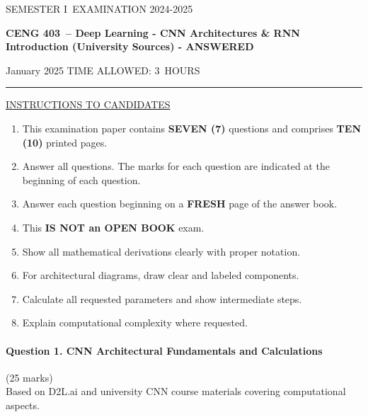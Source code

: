 \documentclass[12pt]{article}
\newcommand{\masunitnumber}{CENG 403}
\newcommand{\examdate}{January 2025}
\newcommand{\academicyear}{2024-2025}
\newcommand{\semester}{I}
\newcommand{\coursename}{Deep Learning - CNN Architectures \& RNN Introduction (University Sources) - ANSWERED}
\newcommand{\numberofhours}{3}
\begin{document}
\setlength{\headsep}{5truemm}
\setlength{\headheight}{14.5truemm}
\setlength{\voffset}{-0.45truein}
\renewcommand{\headrulewidth}{0.0pt}
\begin{center}
SEMESTER \semester\ EXAMINATION \academicyear
\end{center}
\begin{center}
{\bf \masunitnumber\ -- \coursename}
\end{center}
\vspace{20truemm}
\noindent \examdate\hspace{45truemm} TIME ALLOWED: \numberofhours\ HOURS
\vspace{19truemm}
\hrule
\vspace{19truemm}
\noindent\underline{INSTRUCTIONS TO CANDIDATES}
\vspace{8truemm}
\begin{enumerate}
\item This examination paper contains {\bf SEVEN (7)} questions and comprises 
{\bf TEN (10)} printed pages.
\item Answer all questions. 
The marks for each question are indicated at the beginning of each question.
\item Answer each question beginning on a {\bf FRESH} page of the answer book.
\item This {\bf IS NOT an OPEN BOOK} exam.
\item Show all mathematical derivations clearly with proper notation.
\item For architectural diagrams, draw clear and labeled components.
\item Calculate all requested parameters and show intermediate steps.
\item Explain computational complexity where requested.
\end{enumerate}
\newpage
\lhead{}
\rhead{\masunitnumber}
\chead{}
\lfoot{}
\cfoot{\thepage}
\rfoot{}
\setlength{\footskip}{45pt}

\paragraph{Question 1. CNN Architectural Fundamentals and Calculations}\hfill (25 marks)\\
Based on D2L.ai and university CNN course materials covering computational aspects.
\end{document}
